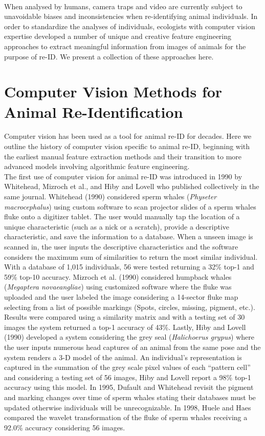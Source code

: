 \documentclass[11pt]{article}
\begin{document}
\newline
\\
When analysed by humans, camera traps and video are currently subject to unavoidable biases and inconsistencies when re-identifying animal individuals. In order to standardize the analyses of individuals, ecologists with computer vision expertise developed a number of unique and creative feature engineering approaches to extract meaningful information from images of animals for the purpose of re-ID. We present a collection of these approaches here.

\section*{Computer Vision Methods for Animal Re-Identification}

Computer vision has been used as a tool for animal re-ID for decades. Here we outline the history of computer vision specific to animal re-ID, beginning with the earliest manual feature extraction methods and their transition to more advanced models involving algorithmic feature engineering.
\newline
\\
The first use of computer vision for animal re-ID was introduced in 1990 by Whitehead, Mizroch et al., and Hiby and Lovell who published collectively in the same journal. Whitehead (1990) considered sperm whales (\textit{Physeter macrocephalus}) using custom software to scan projector slides of a sperm whales fluke onto a digitizer tablet. The user would manually tap the location of a unique characteristic (such as a nick or a scratch), provide a descriptive characteristic, and save the information to a database. When a unseen image is scanned in, the user inputs the descriptive characteristics and the software considers the maximum sum of similarities to return the most similar individual. With a database of 1,015 individuals, 56 were tested returning a 32\% top-1 and 59\% top-10 accuracy. Mizroch et al. (1990) considered humpback whales (\textit{Megaptera novaeangliae}) using customized software where the fluke was uploaded and the user labeled the image considering a 14-sector fluke map selecting from a list of possible markings (Spots, circles, missing, pigment, etc.). Results were compared using a similarity matrix and with a testing set of 30 images the system returned a top-1 accuracy of 43\%. Lastly, Hiby and Lovell (1990) developed a system considering the grey seal (\textit{Halichoerus grypus}) where the user inputs numerous head captures of an animal from the same pose and the system renders a 3-D model of the animal. An individual's representation is captured in the summation of the grey scale pixel values of each ``pattern cell'' and considering a testing set of 56 images, Hiby and Lovell report a 98\% top-1 accuracy using this model. In 1995, Dufault and Whitehead revisit the pigment and marking changes over time of sperm whales stating their databases must be updated otherwise individuals will be unrecognizable. In 1998, Huele and Haes compared the wavelet transformation of the fluke of sperm whales receiving a 92.0\% accuracy considering 56 images.
\end{document}
